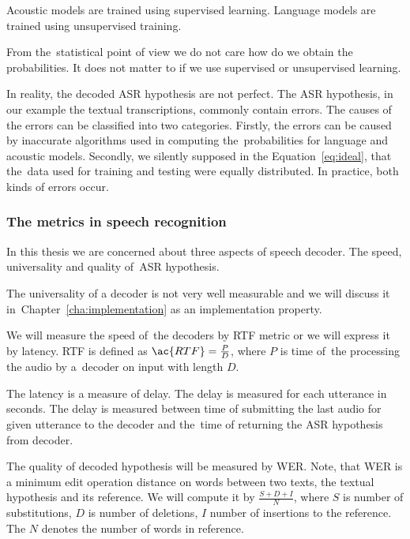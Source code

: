Acoustic models are trained using supervised learning. Language models are trained using unsupervised training. 




From the~statistical point of view we do not care how do we obtain the probabilities.
It does not matter to if we use supervised or unsupervised learning. 

In reality, the decoded ASR hypothesis are not perfect. The ASR hypothesis, in our example the textual transcriptions, 
commonly contain errors. The causes of the errors can be classified into two categories. 
Firstly, the errors can be caused by inaccurate algorithms used in computing 
the~probabilities for language and acoustic models. Secondly, we silently supposed in the Equation~\ref{eq:ideal}, 
that the~data used for training and testing were equally distributed. 
In practice, both kinds of errors occur.

\subsubsection*{The metrics in speech recognition}
\label{sub:the_metrics_in_speech_recognition}
In this thesis we are concerned about three aspects of speech decoder.
The speed, universality and quality of~\ac{ASR} hypothesis.

The universality of a decoder is not very well measurable and we will discuss it 
in~Chapter~\ref{cha:implementation} as an implementation property.

We will measure the speed of~the decoders by \acl{RTF} metric or we will express it by latency.
\ac{RTF} is defined as $\ac{RTF} = \frac{P}{D}$, where $P$ is time of~the processing the audio by a~decoder on input with length $D$. 

The latency is a measure of delay. The delay is measured for each utterance in seconds. 
The delay is measured between time of submitting the last audio for given utterance to the decoder and 
the~time of returning the \ac{ASR} hypothesis from decoder.

The quality of decoded hypothesis will be measured by \ac{WER}.
Note, that \ac{WER} is a minimum edit operation distance on words between two texts, the textual hypothesis
and its reference.
We will compute it by $\frac{S+D+I}{N}$, where $S$ is number of substitutions,
$D$ is number of deletions, $I$ number of insertions to the reference. 
The $N$ denotes the number of words in reference.

